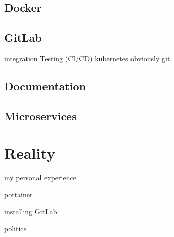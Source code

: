 \documentclass[titlepage]{article}
\begin{document}
\subsection{Docker}

\cite[]{docker}


\subsection{GitLab}

\cite[]{gitlab}

integration
Testing (CI/CD)
kubernetes
obviously git


\subsection{Documentation}

\cite[]{Dagenais:2010:CED:1882291.1882312}

\subsection{Microservices}

\cite[]{micro.8312518}

\section{Reality}

my personal experience

portainer

installing GitLab

politics



\setlength{\bibleftmargin}{.125in}
\doublespacing


\nocite{*}
\end{document}
